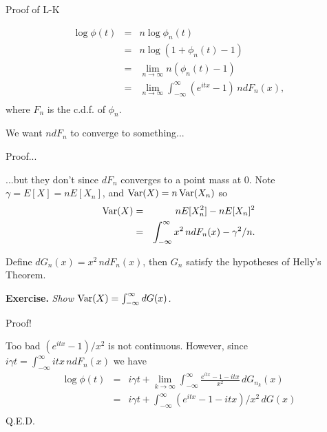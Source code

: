 \documentclass[pdf,colorBG,slideColor,blends]{prosper}
\newcommand{\Var}{\mathop{\rm Var}}
\begin{document}
\begin{slide}{Proof of L-K}

\begin{eqnarray*}
\log\phi(t) &=& n\log\phi_n(t)\\
	&=& n\log (1 + \phi_n(t) - 1)\\
	&=& \lim_{n\to\infty} n(\phi_n(t) - 1)\\
	&=&  \lim_{n\to\infty}\int_{-\infty}^\infty (e^{itx} - 1)\,ndF_n(x),\\
\end{eqnarray*}
where $F_n$ is the c.d.f. of $\phi_n$.

\smallskip

We want $ndF_n$ to converge to something...

\end{slide}

\begin{slide}{Proof...}

...but they don't since $dF_n$ converges to a point mass at 0.
Note $\gamma = E[X] = nE[X_n]$, and $\Var(X) = n\Var(X_n)$ so
\begin{eqnarray*}
\Var(X) &=& nE[X_n^2] - nE[X_n]^2\\
	&=& \int_{-\infty}^\infty x^2\,ndF_n(x) - \gamma^2/n.\\
\end{eqnarray*}

Define $dG_n(x) = x^2\,ndF_n(x)$, then $G_n$ satisfy the hypotheses
of Helly's Theorem.

\smallskip

{\bf Exercise.} {\it Show $\Var(X) = \int_{-\infty}^\infty dG(x)$.}

\end{slide}

\begin{slide}{Proof!}

Too bad $(e^{itx} - 1)/x^2$ is not continuous.
However, since $i\gamma t = \int_{-\infty}^\infty itx\,ndF_n(x)$
we have
\begin{eqnarray*}
	\log\phi(t) &=& i\gamma t + \lim_{k\to\infty} \int_{-\infty}^\infty
		\frac{e^{itx} - 1 - itx}{x^2}\,dG_{n_k}(x)\\
	&=& i\gamma t + \int_{-\infty}^\infty
		(e^{itx} - 1 - itx)/x^2\,dG(x)\\
\end{eqnarray*}
Q.E.D.

\end{slide}
\end{document}
